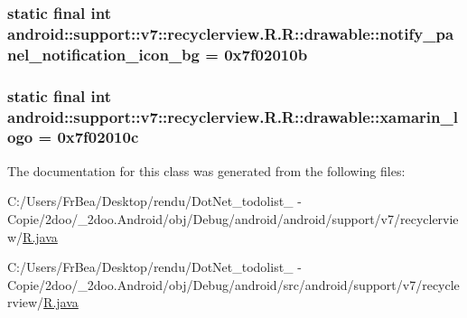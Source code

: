 \hypertarget{classandroid_1_1support_1_1v7_1_1recyclerview_1_1_r_1_1drawable_e0d53bc5dfc45fa8153dec7f0eb79c80}{
\subsubsection[{notify\_\-panel\_\-notification\_\-icon\_\-bg}]{\setlength{\rightskip}{0pt plus 5cm}static final int android::support::v7::recyclerview.R.R::drawable::notify\_\-panel\_\-notification\_\-icon\_\-bg = 0x7f02010b}}
\label{classandroid_1_1support_1_1v7_1_1recyclerview_1_1_r_1_1drawable_e0d53bc5dfc45fa8153dec7f0eb79c80}


\hypertarget{classandroid_1_1support_1_1v7_1_1recyclerview_1_1_r_1_1drawable_d5f9e314c1205ac4b3ff41b94ad856dd}{
\subsubsection[{xamarin\_\-logo}]{\setlength{\rightskip}{0pt plus 5cm}static final int android::support::v7::recyclerview.R.R::drawable::xamarin\_\-logo = 0x7f02010c}}
\label{classandroid_1_1support_1_1v7_1_1recyclerview_1_1_r_1_1drawable_d5f9e314c1205ac4b3ff41b94ad856dd}




The documentation for this class was generated from the following files:\begin{CompactItemize}
\item 
C:/Users/FrBea/Desktop/rendu/DotNet\_\-todolist\_ - Copie/2doo/\_\-2doo.Android/obj/Debug/android/android/support/v7/recyclerview/\hyperlink{android_2support_2v7_2recyclerview_2_r_8java}{R.java}\item 
C:/Users/FrBea/Desktop/rendu/DotNet\_\-todolist\_ - Copie/2doo/\_\-2doo.Android/obj/Debug/android/src/android/support/v7/recyclerview/\hyperlink{src_2android_2support_2v7_2recyclerview_2_r_8java}{R.java}\end{CompactItemize}
